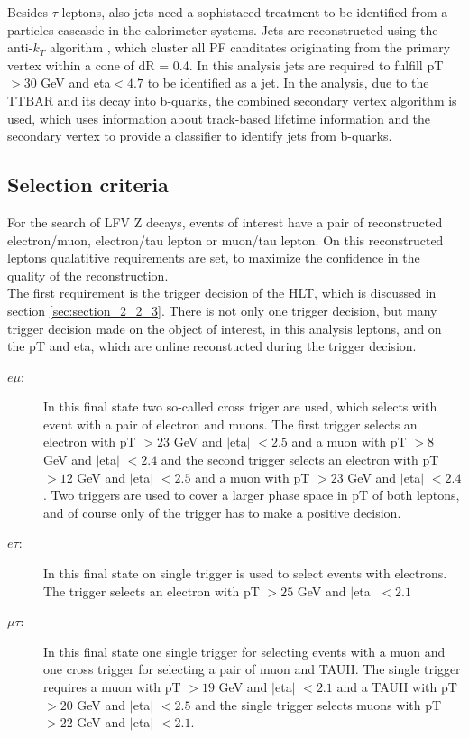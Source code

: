 Besides $\tau$ leptons, also jets need a sophistaced treatment to be identified from a particles cascasde in the calorimeter systems. Jets are reconstructed using the anti-$k_T$ algorithm \cite{ANTIKT}, which cluster all PF canditates originating from the primary vertex within a cone of \gls{dR} = 0.4. In this analysis jets are required to fulfill \gls{pT}$ > 30$ GeV and \gls{eta}$ < 4.7$ to be identified as a jet. In the analysis, due to the \gls{TTBAR} and its decay into b-quarks, the combined secondary vertex algorithm \cite{CSV} is used, which uses information about track-based lifetime information and the secondary vertex to provide a classifier to identify jets from b-quarks. 


\subsection{Selection criteria}
\label{sec:sec_3_2_2}

For the search of \gls{LFV} Z decays, events of interest have a pair of reconstructed electron/muon, electron/tau lepton or muon/tau lepton. On this reconstructed leptons qualatitive requirements are set, to maximize the confidence in the quality of the reconstruction. \\

The first requirement is the trigger decision of the \gls{HLT}, which is discussed in section \ref{sec:section_2_2_3}. There is not only one trigger decision, but many trigger decision made on the object of interest, in this analysis leptons, and on the \gls{pT} and \gls{eta}, which are online reconstucted during the trigger decision. 

\begin{description}
	\item [$e\mu$:] In this final state two so-called cross triger are used, which selects with event with a pair of electron and muons. The first trigger selects an electron with \gls{pT} $> 23$ GeV and $|$\gls{eta}$|$ $< 2.5$ and a muon with \gls{pT} $> 8$ GeV and $|$\gls{eta}$|$ $< 2.4$ and the second trigger selects an electron with \gls{pT} $> 12$ GeV and $|$\gls{eta}$|$ $< 2.5$ and a muon with \gls{pT} $> 23$ GeV and $|$\gls{eta}$|$ $< 2.4$. Two triggers are used to cover a larger phase space in \gls{pT} of both leptons, and of course only of the trigger has to make a positive decision.
	\item [$e\tau$:] In this final state on single trigger is used to select events with electrons. The trigger selects an electron with \gls{pT} $> 25$ GeV and $|$\gls{eta}$|$ $< 2.1$
	\item [$\mu\tau$:] In this final state one single trigger for selecting events with a muon and one cross trigger for selecting a pair of muon and \gls{TAUH}. The single trigger requires a muon with \gls{pT} $> 19$ GeV and $|$\gls{eta}$|$ $< 2.1$ and a \gls{TAUH} with \gls{pT} $> 20$ GeV and $|$\gls{eta}$|$ $< 2.5$ and the single trigger selects muons with \gls{pT} $> 22$ GeV and $|$\gls{eta}$|$ $< 2.1$.
\end{description}

